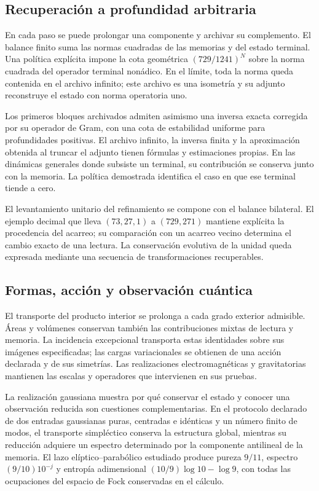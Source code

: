 \subsection*{Recuperación a profundidad arbitraria}
En cada paso se puede prolongar una componente y archivar su complemento. El balance finito suma las normas cuadradas de las memorias y del estado terminal. Una política explícita impone la cota geométrica \((729/1241)^N\) sobre la norma cuadrada del operador terminal nonádico. En el límite, toda la norma queda contenida en el archivo infinito; este archivo es una isometría y su adjunto reconstruye el estado con norma operatoria uno.

Los primeros bloques archivados admiten asimismo una inversa exacta corregida por su operador de Gram, con una cota de estabilidad uniforme para profundidades positivas. El archivo infinito, la inversa finita y la aproximación obtenida al truncar el adjunto tienen fórmulas y estimaciones propias. En las dinámicas generales donde subsiste un terminal, su contribución se conserva junto con la memoria. La política demostrada identifica el caso en que ese terminal tiende a cero.

El levantamiento unitario del refinamiento se compone con el balance bilateral. El ejemplo decimal que lleva \((73,27,1)\) a \((729,271)\) mantiene explícita la procedencia del acarreo; su comparación con un acarreo vecino determina el cambio exacto de una lectura. La conservación evolutiva de la unidad queda expresada mediante una secuencia de transformaciones recuperables.



\subsection*{Formas, acción y observación cuántica}
El transporte del producto interior se prolonga a cada grado exterior admisible. Áreas y volúmenes conservan también las contribuciones mixtas de lectura y memoria. La incidencia excepcional transporta estas identidades sobre sus imágenes especificadas; las cargas variacionales se obtienen de una acción declarada y de sus simetrías. Las realizaciones electromagnéticas y gravitatorias mantienen las escalas y operadores que intervienen en sus pruebas.

La realización gaussiana muestra por qué conservar el estado y conocer una observación reducida son cuestiones complementarias. En el protocolo declarado de dos entradas gaussianas puras, centradas e idénticas y un número finito de modos, el transporte simpléctico conserva la estructura global, mientras su reducción adquiere un espectro determinado por la componente antilineal de la memoria. El lazo elíptico--parabólico estudiado produce pureza \(9/11\), espectro \((9/10)10^{-j}\) y entropía adimensional \((10/9)\log10-\log9\), con todas las ocupaciones del espacio de Fock conservadas en el cálculo.

